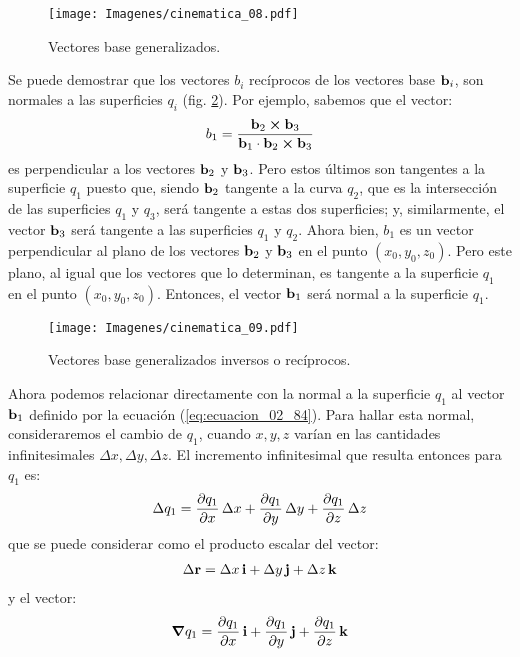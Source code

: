 \begin{figure}[H]
    \centering
    \texttt{[image: Imagenes/cinematica\_08.pdf]}
    \caption{Vectores base generalizados.}
    \label{fig:figura_02_08}
\end{figure}
Se puede demostrar que los vectores $b_{i}$ recíprocos de los vectores base $\vb{b}_{i}$, son normales a las superficies $q_{i}$ (fig. \ref{fig:figura_02_09}). Por ejemplo, sabemos que el vector:
\begin{align}
    b_{1} = \dfrac{\vb{b}_{2} \cp \vb{b}_{3}}{\vb{b}_{1} \cdot \vb{b}_{2} \cp \vb{b}_{3}}
    \label{eq:ecuacion_02_84}
\end{align}
es perpendicular a los vectores $\vb{b}_{2}$ y $\vb{b}_{3}$. Pero estos últimos son tangentes a la superficie $q_{1}$ puesto que, siendo $\vb{b}_{2}$ tangente a la curva $q_{2}$, que es la intersección de las superficies $q_{1}$ y $q_{3}$, será tangente a estas dos superficies; y, similarmente, el vector $\vb{b}_{3}$ será tangente a las superficies $q_{1}$ y $q_{2}$. Ahora bien, $b_{1}$ es un vector perpendicular al plano de los vectores $\vb{b}_{2}$ y $\vb{b}_{3}$ en el punto $( x_{0}, y_{0}, z_{0})$. Pero este plano, al igual que los vectores que lo determinan, es tangente a la superficie $q_{1}$ en el punto $(x_{0}, y_{0}, z_{0})$. Entonces, el vector $\vb{b}_{1}$ será normal a la superficie $q_{1}$.
\begin{figure}[H]
    \centering
    \texttt{[image: Imagenes/cinematica\_09.pdf]}
    \caption{Vectores base generalizados inversos o recíprocos.}
    \label{fig:figura_02_09}
\end{figure}
Ahora podemos relacionar directamente con la normal a la superficie $q_{1}$ al vector $\vb{b}_{1}$ definido por la ecuación (\ref{eq:ecuacion_02_84}). Para hallar esta normal, consideraremos el cambio de $q_{1}$, cuando $x, y, z$ varían en las cantidades infinitesimales $\Delta x, \Delta y, \Delta z$. El incremento infinitesimal que resulta entonces para $q_{1}$ es:
\begin{align}
    \Delta q_{1} = \pdv{q_{1}}{x} \, \Delta x + \pdv{q_{1}}{y} \, \Delta y + \pdv{q_{1}}{z} \, \Delta z
    \label{eq:ecuacion_02_85}
\end{align} 
que se puede considerar como el producto escalar del vector:
\begin{align}
    \Delta \vb{r} = \Delta x \, \vb{i} + \Delta y \, \vb{j} + \Delta z \, \vb{k}
    \label{eq:ecuacion_02_86}
\end{align}
y el vector:
\begin{align}
    \grad{q_{1}} = \pdv{q_{1}}{x} \, \vb{i} + \pdv{q_{1}}{y} \, \vb{j} + \pdv{q_{1}}{z} \, \vb{k}
    \label{eq:ecuacion_02_87}
\end{align}
